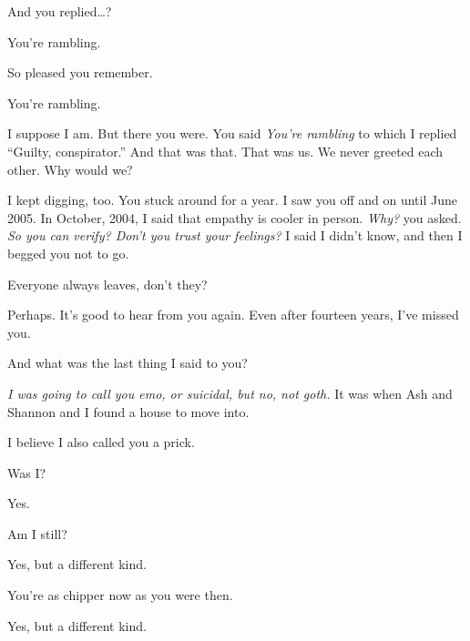 And you replied\ldots{}?

\begin{ally}
You're rambling.
\end{ally}
So pleased you remember.

\begin{ally}
You're rambling.
\end{ally}
I suppose I am. But there you were. You said \emph{You're rambling} to which I replied ``Guilty, conspirator.'' And that was that. That was us. We never greeted each other. Why would we?

I kept digging, too. You stuck around for a year. I saw you off and on until June 2005. In October, 2004, I said that empathy is cooler in person. \emph{Why?} you asked. \emph{So you can verify? Don't you trust your feelings?} I said I didn't know, and then I begged you not to go.

\begin{ally}
Everyone always leaves, don't they?
\end{ally}
Perhaps. It's good to hear from you again. Even after fourteen years, I've missed you.

\begin{ally}
And what was the last thing I said to you?
\end{ally}
\emph{I was going to call you emo, or suicidal, but no, not goth.} It was when Ash and Shannon and I found a house to move into.

\begin{ally}
I believe I also called you a prick.
\end{ally}
Was I?

\begin{ally}
Yes.
\end{ally}
Am I still?

\begin{ally}
Yes, but a different kind.
\end{ally}
You're as chipper now as you were then.

\begin{ally}
Yes, but a different kind.
\end{ally}
\newpage
